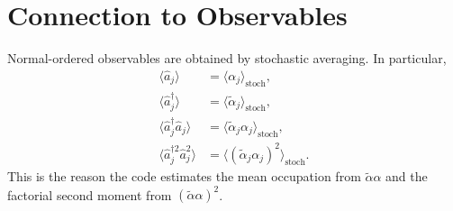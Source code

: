 \documentclass[12pt]{article}
\begin{document}
\section*{Connection to Observables}
Normal-ordered observables are obtained by stochastic averaging. In particular,
\begin{align}
\langle \hat a_j \rangle &= \langle \alpha_j \rangle_{\mathrm{stoch}}, \\
\langle \hat a_j^\dagger \rangle &= \langle \widetilde{\alpha}_j \rangle_{\mathrm{stoch}}, \\
\langle \hat a_j^\dagger \hat a_j \rangle
&=
\langle \widetilde{\alpha}_j \alpha_j \rangle_{\mathrm{stoch}}, \\
\langle \hat a_j^{\dagger 2}\hat a_j^2 \rangle
&=
\langle (\widetilde{\alpha}_j \alpha_j)^2 \rangle_{\mathrm{stoch}}.
\end{align}
This is the reason the code estimates the mean occupation from $\widetilde{\alpha}\alpha$ and the factorial second moment from $(\widetilde{\alpha}\alpha)^2$.
\end{document}
